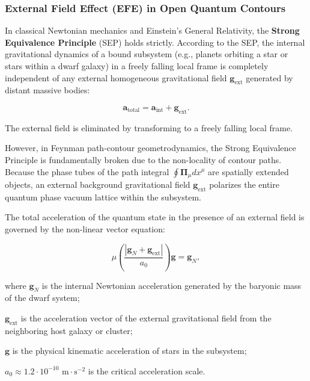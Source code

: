 \documentclass[11pt,a4paper]{article}
\theoremstyle{definition}
\begin{document}
\subsubsection{External Field Effect (EFE) in Open Quantum Contours}\label{sec:4.3.1}

In classical Newtonian mechanics and Einstein's General Relativity, the \textbf{Strong Equivalence Principle} (SEP) holds strictly. According to the SEP, the internal gravitational dynamics of a bound subsystem (e.g., planets orbiting a star or stars within a dwarf galaxy) in a freely falling local frame is completely independent of any external homogeneous gravitational field $\mathbf{g}_{\text{ext}}$ generated by distant massive bodies:

\begin{equation}\label{eq:4.26}\tag{4.26}
\mathbf{a}_{\text{total}} = \mathbf{a}_{\text{int}} + \mathbf{g}_{\text{ext}}.
\end{equation}

The external field is eliminated by transforming to a freely falling local frame.

However, in Feynman path-contour geometrodynamics, the Strong Equivalence Principle is fundamentally broken due to the non-locality of contour paths. Because the phase tubes of the path integral $\oint \mathbf{\Pi}_\mu dx^\mu$ are spatially extended objects, an external background gravitational field $\mathbf{g}_{\text{ext}}$ polarizes the entire quantum phase vacuum lattice within the subsystem.

The total acceleration of the quantum state in the presence of an external field is governed by the non-linear vector equation:

\begin{equation}\label{eq:4.27}\tag{4.27}
\mu\left( \frac{|\mathbf{g}_N + \mathbf{g}_{\text{ext}}|}{a_0} \right) \mathbf{g} = \mathbf{g}_N,
\end{equation}

where $\mathbf{g}_N$ is the internal Newtonian acceleration generated by the baryonic mass of the dwarf system;  

$\mathbf{g}_{\text{ext}}$ is the acceleration vector of the external gravitational field from the neighboring host galaxy or cluster;  

$\mathbf{g}$ is the physical kinematic acceleration of stars in the subsystem;  

$a_0 \approx 1.2 \cdot 10^{-10}\text{ m}\cdot\text{s}^{-2}$ is the critical acceleration scale.
\end{document}
